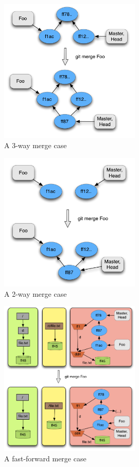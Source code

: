 \begin{figure}[!t]
   \centering
   \includegraphics[width=0.6\textwidth]{images/3merge.png}
   \caption{A 3-way merge case}\label{fig:3mergecase}
\end{figure}
\begin{figure}[!t]
   \centering
   \includegraphics[width=0.6\textwidth]{images/2merge.png}
   \caption{A 2-way merge case}\label{fig:2mergecase}
\end{figure}
\begin{figure}[!t]
   \centering
   \includegraphics[width=0.6\textwidth]{images/fast_forward_merge1.png}
   \caption{A fast-forward merge case}\label{fig:ffmerge1}
\end{figure}

